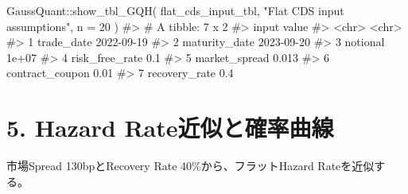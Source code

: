 \documentclass[
  letterpaper,
  DIV=11,
  numbers=noendperiod]{scrreprt}
\newenvironment{Shaded}{\begin{snugshade}}{\end{snugshade}}
\newcommand{\AttributeTok}[1]{\textcolor[rgb]{0.40,0.45,0.13}{#1}}
\newcommand{\CommentTok}[1]{\textcolor[rgb]{0.37,0.37,0.37}{#1}}
\newcommand{\DecValTok}[1]{\textcolor[rgb]{0.68,0.00,0.00}{#1}}
\newcommand{\FunctionTok}[1]{\textcolor[rgb]{0.28,0.35,0.67}{#1}}
\newcommand{\NormalTok}[1]{\textcolor[rgb]{0.00,0.23,0.31}{#1}}
\newcommand{\SpecialCharTok}[1]{\textcolor[rgb]{0.37,0.37,0.37}{#1}}
\newcommand{\StringTok}[1]{\textcolor[rgb]{0.13,0.47,0.30}{#1}}
\begin{document}
\begin{Shaded}
\begin{Highlighting}[]
\NormalTok{GaussQuant}\SpecialCharTok{::}\FunctionTok{show\_tbl\_GQH}\NormalTok{(}
\NormalTok{  flat\_cds\_input\_tbl,}
  \StringTok{"Flat CDS input assumptions"}\NormalTok{,}
  \AttributeTok{n =} \DecValTok{20}
\NormalTok{)}
\CommentTok{\#\textgreater{} \# A tibble: 7 x 2}
\CommentTok{\#\textgreater{}   input           value     }
\CommentTok{\#\textgreater{}   \textless{}chr\textgreater{}           \textless{}chr\textgreater{}     }
\CommentTok{\#\textgreater{} 1 trade\_date      2022{-}09{-}19}
\CommentTok{\#\textgreater{} 2 maturity\_date   2023{-}09{-}20}
\CommentTok{\#\textgreater{} 3 notional        1e+07     }
\CommentTok{\#\textgreater{} 4 risk\_free\_rate  0.1       }
\CommentTok{\#\textgreater{} 5 market\_spread   0.013     }
\CommentTok{\#\textgreater{} 6 contract\_coupon 0.01      }
\CommentTok{\#\textgreater{} 7 recovery\_rate   0.4}
\end{Highlighting}
\end{Shaded}

\section{5. Hazard
Rate近似と確率曲線}\label{hazard-rateux8fd1ux4f3cux3068ux78baux7387ux66f2ux7dda}

市場Spread 130bpとRecovery Rate 40\%から、フラットHazard
Rateを近似する。
\end{document}
